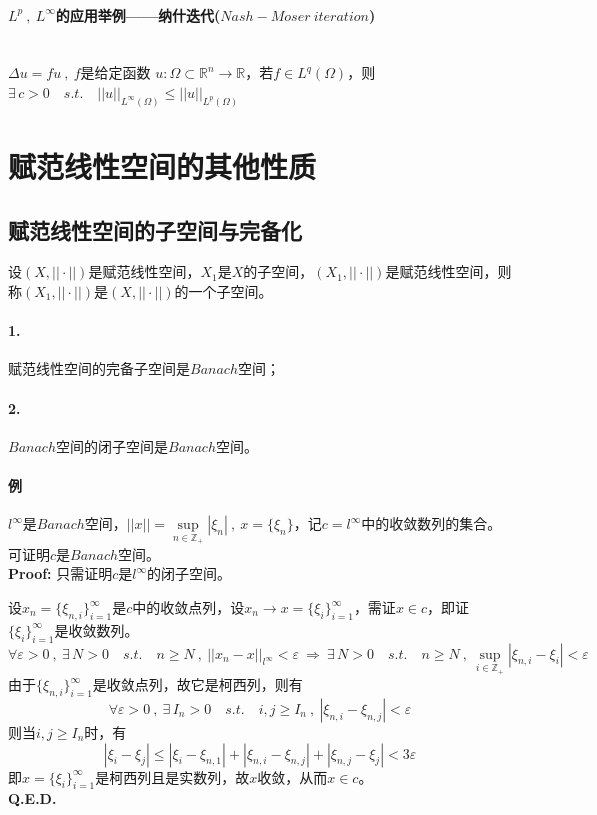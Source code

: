 \paragraph*{$L^p \ , \ L^{\infty}$的应用举例——纳什迭代($Nash-Moser \ iteration$)} \quad \\
$\Delta u=fu \ , \ f$是给定函数 $u:\Omega \subset \mathbb{R}^n \to \mathbb{R}$，若$f \in L^q(\Omega)$，则$\exists \, c>0 \quad s.t. \quad ||u||_{L^{\infty}(\Omega)} \leq ||u||_{L^p(\Omega)}$

\section{赋范线性空间的其他性质}
\subsection{赋范线性空间的子空间与完备化}
设$(X,||\cdot||)$是赋范线性空间，$X_1$是$X$的子空间，$(X_1,||\cdot||)$是赋范线性空间，则称$(X_1,||\cdot||)$是$(X,||\cdot||)$的一个子空间。
\begin{theorem}
    \paragraph*{1.} 赋范线性空间的完备子空间是$Banach$空间；
    \paragraph*{2.} $Banach$空间的闭子空间是$Banach$空间。
\end{theorem}
\paragraph*{例} $l^{\infty}$是$Banach$空间，$||x||=\mathop \text{sup}\limits_{n \in \mathbb{Z}_+}|\xi_n| \ , \ x=\{\xi_n\}$，记$c=l^{\infty}$中的收敛数列的集合。可证明$c$是$Banach$空间。\\
\textbf{Proof:} 只需证明$c$是$l^{\infty}$的闭子空间。

设$x_n=\{\xi_{n,i}\}_{i=1}^{\infty}$是$c$中的收敛点列，设$x_n \to x=\{\xi_i\}_{i=1}^{\infty}$，需证$x \in c$，即证$\{\xi_i\}_{i=1}^{\infty}$是收敛数列。
\[\forall \varepsilon>0 \ , \ \exists \, N>0 \quad s.t. \quad n \geq N \ , \ ||x_n-x||_{l^{\infty}}<\varepsilon \ \Rightarrow \ \exists \, N>0 \quad s.t. \quad n \geq N \ , \ \mathop \text{sup}\limits_{i \in \mathbb{Z}_+}|\xi_{n,i}-\xi_i|<\varepsilon\]
由于$\{\xi_{n,i}\}_{i=1}^{\infty}$是收敛点列，故它是柯西列，则有
\[\forall \varepsilon>0 \ , \ \exists \, I_n>0 \quad s.t. \quad i,j \geq I_n \ , \ |\xi_{n,i}-\xi_{n,j}|<\varepsilon\]
则当$i,j \geq I_n$时，有
\[|\xi_{i}-\xi_{j}| \leq |\xi_{i}-\xi_{n,1}|+|\xi_{n,i}-\xi_{n,j}|+|\xi_{n,j}-\xi_{j}|<3\varepsilon\]
即$x=\{\xi_i\}_{i=1}^{\infty}$是柯西列且是实数列，故$x$收敛，从而$x \in c$。\\
\textbf{Q.E.D.}

